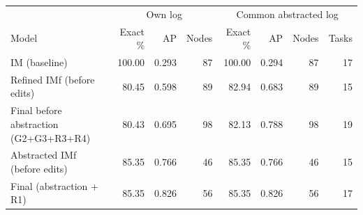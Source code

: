 \begin{tabular}{lrrrrrrr}
\hline
 & \multicolumn{3}{c}{Own log} & \multicolumn{4}{c}{Common abstracted log} \\
Model & Exact \% & AP & Nodes & Exact \% & AP & Nodes & Tasks \\
\hline
IM (baseline) & 100.00 & 0.293 & 87 & 100.00 & 0.294 & 87 & 17 \\
Refined IMf (before edits) & 80.45 & 0.598 & 89 & 82.94 & 0.683 & 89 & 15 \\
Final before abstraction (G2+G3+R3+R4) & 80.43 & 0.695 & 98 & 82.13 & 0.788 & 98 & 19 \\
Abstracted IMf (before edits) & 85.35 & 0.766 & 46 & 85.35 & 0.766 & 46 & 15 \\
Final (abstraction + R1) & 85.35 & 0.826 & 56 & 85.35 & 0.826 & 56 & 17 \\
\hline
\end{tabular}
